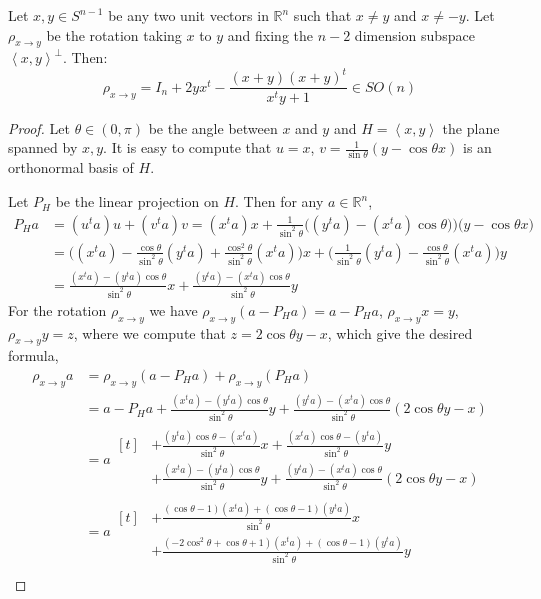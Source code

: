 \begin{computation}\label{com:rotation} Let $x,y\in S^{n-1}$ be any two unit vectors in $\mathbb{R}^n$ such that $x\neq y$ and $x\neq -y$. Let $\rho_{x\to y}$ be the rotation taking $x$ to $y$ and fixing the $n-2$ dimension subspace $\left<x,y\right>^{\perp}$. Then:
\[\rho_{x\to y}=I_n+2yx^t-\frac{(x+y)(x+y)^t}{x^ty+1}\in SO(n)\]
\end{computation}
\begin{proof} Let $\theta\in(0,\pi)$ be the angle between $x$ and $y$ and $H=\left<x,y\right>$ the plane spanned by $x,y$. It is easy to compute that $u=x$, $v=\frac{1}{\sin\theta}(y-\cos\theta x)$ is an orthonormal basis of $H$.

Let $P_H$ be the linear projection on $H$. Then for any $a\in\mathbb{R}^n$,
\begin{align*}
P_Ha&=(u^ta)u+(v^ta)v
=(x^ta)x+\frac{1}{\sin^2\theta}\big((y^ta)-(x^ta)\cos\theta)\big)\big(y-\cos\theta x\big)\\
&=\Big((x^ta)-\frac{\cos\theta}{\sin^2\theta}(y^ta)+\frac{\cos^2\theta}{\sin^2\theta}(x^ta)\Big)x+\Big(\frac{1}{\sin^2\theta}(y^ta)-\frac{\cos\theta}{\sin^2\theta}(x^ta)\Big)y\\
&=\frac{(x^ta)-(y^ta)\cos\theta}{\sin^2\theta}x+\frac{(y^ta)-(x^ta)\cos\theta}{\sin^2\theta}y
\end{align*}
For the rotation $\rho_{x\to y}$ we have
$\rho_{x\to y}(a-P_Ha)=a-P_Ha$, $\rho_{x\to y}x=y$, $\rho_{x\to y}y=z$,
where we compute that $z=2\cos\theta y-x$, which give the desired formula,
\begingroup
\allowdisplaybreaks
\begin{align*}
\rho_{x\to y}a&=\rho_{x\to y}(a-P_Ha)+\rho_{x\to y}(P_Ha)\\
&=a-P_Ha+\frac{(x^ta)-(y^ta)\cos\theta}{\sin^2\theta}y+\frac{(y^ta)-(x^ta)\cos\theta}{\sin^2\theta}(2\cos\theta y-x)\\
&=a\begin{aligned}[t]&+\frac{(y^ta)\cos\theta-(x^ta)}{\sin^2\theta}x+\frac{(x^ta)\cos\theta-(y^ta)}{\sin^2\theta}y\\
&+\frac{(x^ta)-(y^ta)\cos\theta}{\sin^2\theta}y+\frac{(y^ta)-(x^ta)\cos\theta}{\sin^2\theta}(2\cos\theta y-x)\end{aligned}\\
&=a\begin{aligned}[t]&+\frac{(\cos\theta-1)(x^ta)+(\cos\theta-1)(y^ta)}{\sin^2\theta}x\\
&+\frac{(-2\cos^2\theta+\cos\theta+1)(x^ta)+(\cos\theta-1)(y^ta)}{\sin^2\theta}y\end{aligned}\\

\end{align*}
\end{proof}
